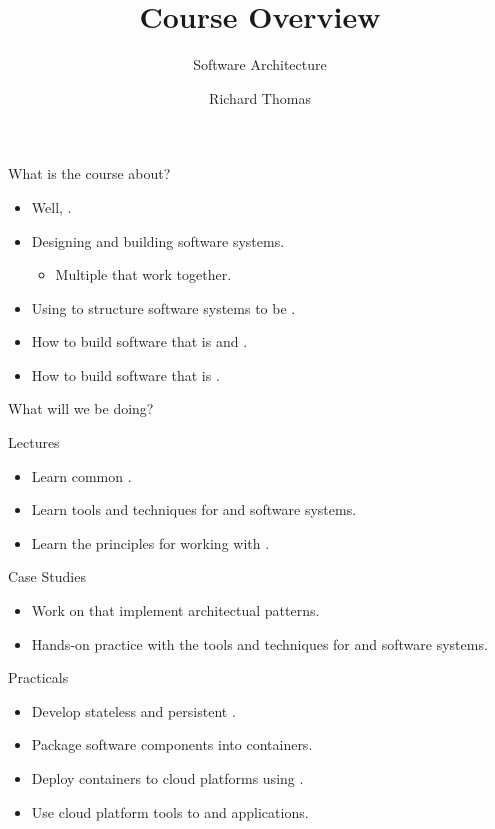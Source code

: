 \documentclass{slide}
\title{Course Overview}
\subtitle{Software Architecture}
\institute{University of Queensland}
\author{Richard Thomas}
\date{\week{1}}
\begin{document}
\maketitle

\begin{frame}{What is the course about?}
\Large
\begin{itemize}[<+->]
    \item Well, .
	\vspace{2mm}
    \item Designing and building software systems.
    \begin{itemize}
        \large \item Multiple  that work together.
    \end{itemize}
    \item Using  to structure software systems to be .
    \item How to build software that is  and .
    \item How to build software that is .
\end{itemize}
\end{frame}

\begin{frame}{What will we be doing?}

{\color{pine} Lectures}
\begin{itemize}[<+->]
    \item Learn common .
    \item Learn tools and techniques for  and  software systems.
    \item Learn the principles for working with .
\end{itemize}

{\color{pine} Case Studies}
\begin{itemize}[<+->]
    \item Work on  that implement architectual patterns.
    \item Hands-on practice with the tools and techniques for  and  software systems.
\end{itemize}

{\color{pine} Practicals}
\begin{itemize}[<+->]
    \item Develop stateless and persistent .
    \item Package software components into  containers.
    \item Deploy containers to cloud platforms using .
    \item Use cloud platform tools to  and  applications.
\end{itemize}

\end{frame}
\end{document}
